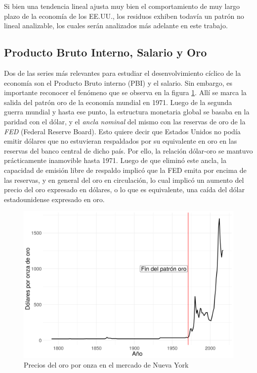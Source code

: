 \documentclass[a4paper]{article}
\begin{document}
Si bien una tendencia lineal ajusta muy bien el comportamiento de muy largo plazo de la economía de los EE.UU., los residuos exhiben todavía un patrón no lineal analizable, los cuales serán analizados más adelante en este trabajo.

\subsection{Producto Bruto Interno, Salario y Oro}

Dos de las series más relevantes para estudiar el desenvolvimiento cíclico de la economía son el Producto Bruto interno (PBI) y el salario. Sin embargo, es importante reconocer el fenómeno que se observa en la figura \ref{fig:oro}. Allí se marca la salida del patrón oro de la economía mundial en 1971. Luego de la segunda guerra mundial y hasta ese punto, la estructura monetaria global se basaba en la paridad con el dólar, y el \textit{ancla nominal} del mismo con las reservas de oro de la \textit{FED} (Federal Reserve Board). Esto quiere decir que Estados Unidos no podía emitir dólares que no estuvieran respaldados por su equivalente en oro en las reservas del banco central de dicho país. Por ello, la relación dólar-oro se mantuvo prácticamente inamovible hasta 1971. Luego de que eliminó este ancla, la capacidad de emisión libre de respaldo implicó que la FED emita por encima de las reservas, y en general del oro en circulación, lo cual implicó un aumento del precio del oro expresado en dólares, o lo que es equivalente, una caída del dólar estadounidense expresado en oro.

\begin{figure}[H]
	\centering
	\includegraphics[width=0.8\linewidth]{oro.png}
	\caption{Precios del oro por onza en el mercado de Nueva York} \label{fig:oro}
\end{figure}
\end{document}
